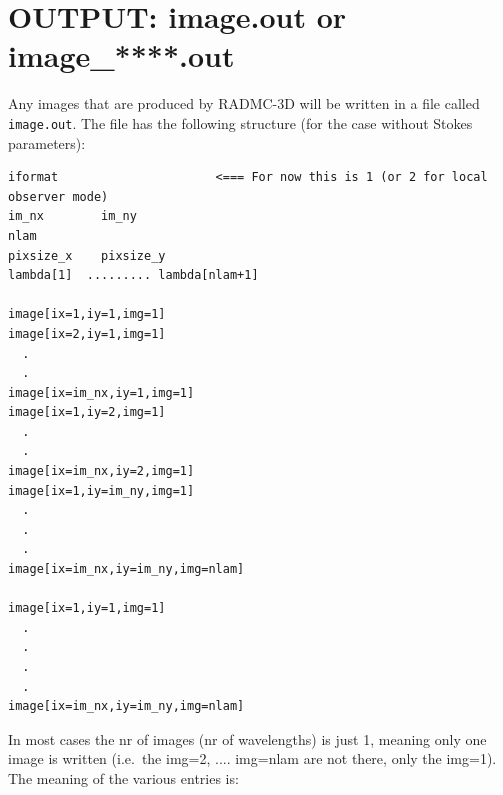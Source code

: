 \documentclass{report}
\newenvironment{asciibox}%
  {\begin{list}{}{%
    \setlength{\topsep}{0.5em}%
    \setlength{\parskip}{0em}%
    \setlength{\parsep}{0em}%
    \setlength{\itemsep}{0em}%
    \setlength{\rightmargin}{0em}%
    \setlength{\leftmargin}{3.0em}%
    \setlength{\labelsep}{1em}%
    \setlength{\labelwidth}{2em}%
  }\normalfont\footnotesize\item}
  {\end{list}}
\begin{document}
\section{OUTPUT: image.out or image\_****.out}
\label{sec-image-out}
Any images that are produced by RADMC-3D will be written in a file called
{\small\tt image.out}. The file has the following structure (for the case
without Stokes parameters):
\begin{asciibox}\begin{verbatim}
iformat                      <=== For now this is 1 (or 2 for local observer mode)
im_nx        im_ny
nlam
pixsize_x    pixsize_y
lambda[1]  ......... lambda[nlam+1]

image[ix=1,iy=1,img=1]
image[ix=2,iy=1,img=1]
  .
  .
image[ix=im_nx,iy=1,img=1]
image[ix=1,iy=2,img=1]
  .
  .
image[ix=im_nx,iy=2,img=1]
image[ix=1,iy=im_ny,img=1]
  .
  .
  .
image[ix=im_nx,iy=im_ny,img=nlam]

image[ix=1,iy=1,img=1]
  .
  .
  .
  .
image[ix=im_nx,iy=im_ny,img=nlam]
\end{verbatim}\end{asciibox}
In most cases the nr of images (nr of wavelengths) is just 1, meaning only
one image is written (i.e.\ the img=2, .... img=nlam are not there, only
the img=1). The meaning of the various entries is:
\end{document}
